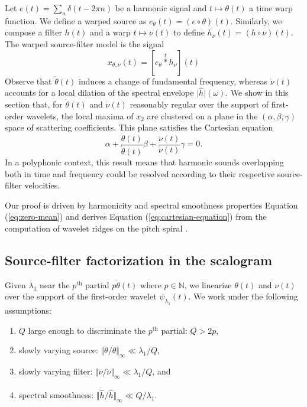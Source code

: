 \documentclass[twoside,a4paper]{article}
\begin{document}
Let $e(t)=\sum_{n}\delta(t-2\pi n)$ be a harmonic signal and
$t\mapsto\theta(t)$ a time warp function. We define a warped source
as $e_{\theta}(t)=(e\circ\theta)(t)$. Similarly, we compose a
filter $h(t)$ and a warp $t\mapsto\nu(t)$ to define $h_{\nu}(t)=(h\circ\nu)(t)$.
The warped source-filter model is the signal
\begin{equation}
x_{\theta, \nu}(t) =
[e_{\theta} \overset{t}{\ast} h_{\nu}](t)
\label{eq:source-filter}
\end{equation}
Observe that $\dot{\theta}(t)$ induces a change of fundamental frequency, where\-as
$\dot{\nu}(t)$ accounts for a local dilation of the spectral
envelope $\vert\widehat{h}\vert(\omega)$.
We show in this section that, for $\dot{\theta}(t)$ and $\dot{\nu}(t)$ reasonably regular over the support of first-order wavelets,
the local maxima of $x_{2}$ are clustered on a plane in the $(\alpha,\beta,\gamma)$ space of scattering coefficients.
This plane satisfies the Cartesian equation
\begin{equation}
\alpha +
\dfrac{\ddot{\theta}(t)}{\dot{\theta}(t)}\beta +
\dfrac{\ddot{\nu}(t)}{\dot{\nu}(t)}\gamma = 0.
\label{eq:cartesian-equation}
\end{equation}
In a polyphonic context, this result means that harmonic sounds overlapping both in time and frequency could be resolved according to their respective source-filter velocities.

Our proof is driven by harmonicity and spectral smoothness properties \textemdash{} Equation (\ref{eq:zero-mean}) \textemdash{} and derives Equation (\ref{eq:cartesian-equation}) from the computation of wavelet ridges on the pitch spiral \cite{Delprat1992}.



\subsection{Source-filter factorization in the scalogram}
Given $\lambda_1$ near the $p^{\textrm{th}}$ partial $p \dot{\theta}(t)$ where $p \in \mathbb{N}$, we linearize $\theta(t)$ and $\nu(t)$ over the support of the first-order wavelet $\psi_{\lambda_1}(t)$. We work under the following assumptions:

\renewcommand{\labelenumi}{(\alph{enumi})}
\begin{enumerate}
\item $Q$ large enough to discriminate the $p^\text{th}$ partial: $Q>2p$,
\item slowly varying source: $\Vert\ddot{\theta}/\dot{\theta}\Vert_{\infty} \ll \lambda_{1}/Q$,
\item slowly varying filter: $\Vert\ddot{\nu}/\dot{\nu}\Vert_{\infty}\ll\lambda_{1}/Q$, and
\item spectral smoothness: $\Vert\dot{\hat{h}}/\hat{h}\Vert_{\infty} \ll Q / \lambda_{1}$.
\end{enumerate}
\end{document}
